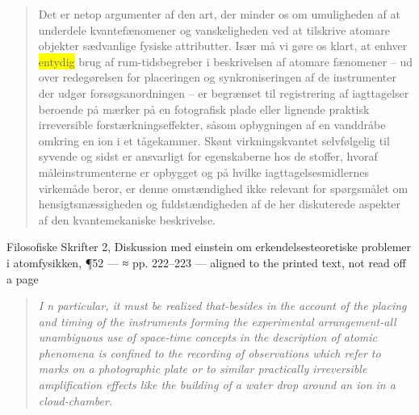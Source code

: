 \documentclass[11pt]{article}
\newcommand{\dcite}[1]{{\nopagebreak\raggedleft\small #1\par}\medskip}
\newcommand{\tlg}[1]{{\setlength{\fboxsep}{0.8pt}\colorbox{yellow}{#1}}}
\newcommand{\olg}[1]{{\setlength{\fboxsep}{0.8pt}\colorbox{cyan!25}{#1}}}
\begin{document}
\begin{quote}
Det er netop argumenter af den art, der minder os om umuligheden af at underdele kvantefænomener og vanskeligheden ved at tilskrive atomare objekter sædvanlige fysiske attributter. Især må vi gøre os klart, at enhver \tlg{entydig} brug af rum-tidsbegreber i beskrivelsen af atomare fænomener – ud over redegørelsen for placeringen og synkroniseringen af de instrumenter der udgør forsøgsanordningen – er begrænset til registrering af iagttagelser beroende på mærker på en fotografisk plade eller lignende praktisk irreversible forstærkningseffekter, såsom opbygningen af en vanddråbe omkring en ion i et tågekammer. Skønt virkningskvantet selvfølgelig til syvende og sidst er ansvarligt for egenskaberne hos de stoffer, hvoraf måleinstrumenterne er opbygget og på hvilke iagttagelsesmidlernes virkemåde beror, er denne omstændighed ikke relevant for spørgsmålet om hensigtsmæssigheden og fuldstændigheden af de her diskuterede aspekter af den kvantemekaniske beskrivelse.
\end{quote}
\dcite{Filosofiske Skrifter 2, Diskussion med einstein om erkendelsesteoretiske problemer i atomfysikken, ¶52 — ≈ pp. 222–223 — aligned to the printed text, not read off a page}
{\footnotesize\begin{quote}\itshape
I n particular, it must be realized that-besides in the account of the placing and timing of the instruments forming the experimental arrangement-all \olg{unambiguous} use of space-time concepts in the description of atomic phenomena is confined to the recording of observations which refer to marks on a photographic plate or to similar practically irreversible amplification effects like the building of a water drop around an ion in a cloud-chamber.
\end{quote}}
\end{document}

